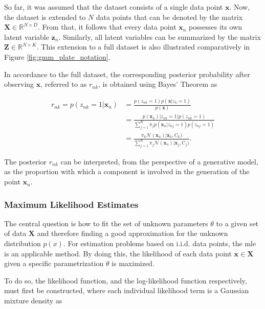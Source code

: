 So far, it was assumed that the dataset consists of a single data point $\bm{x}$. Now, the dataset is extended to $N$ data points that can be denoted by the matrix $\bm{X} \in \mathbb{R}^{N \times D}$. From that, it follows that every data point $\bm{x}_n$ possesses its own latent variable $\bm{z}_n$. Similarly, all latent variables can be summarized by the matrix $\bm{Z} \in \mathbb{R}^{N \times K}$. This extension to a full dataset is also illustrated comparatively in Figure \ref{fig:gmm_plate_notation}.

In accordance to the full dataset, the corresponding posterior probability after observing $\bm{x}$, referred to as $r_{nk}$, is obtained using Bayes' Theorem as

\begin{equation}\label{eq:responsibilities}
    \begin{aligned}
        r_{nk}=p(z_{nk}=1|\bm{x}_n) &= \frac{p(z_{nk}=1)p(\bm{x} | z_k=1)}{p(\bm{x})}\\[5pt]
        &= \frac{p(\bm{x}_n) | z_{nk}=1)p(z_{nk}=1)}{\sum_{j=1}^K\pi_j p(\bm{x}_n | z_{nj}=1)p(z_{nj}=1)} \\[5pt]
        &= \frac{\pi_k\mathcal{N}(\bm{x}_n) | \overline{\bm{x}}_k, \bm{\mathrm{C}}_k)}{\sum_{j=1}^K\pi_j\mathcal{N}(\bm{x}_n) | \overline{\bm{x}}_j, \bm{\mathrm{C}}_j)}.
    \end{aligned}
\end{equation}

The posterior $r_{nk}$ can be interpreted, from the perspective of a generative model, as the proportion with which a component is involved in the generation of the point $\bm{x}_n$.

\subsubsection{Maximum Likelihood Estimates}

The central question is how to fit the set of unknown parameters $\theta$ to a given set of data $\bm{X}$ and therefore finding a good approximation for the unknown distribution $p(x)$. For estimation problems based on i.i.d. data points, the \acrfull{mle} is an applicable method. \cite[p. 317]{dei_2020} By doing this, the likelihood of each data point $\bm{x} \in \bm{X}$ given a specific parametrization $\theta$ is maximized. 

\newpage

To do so, the likelihood function, and the log-likelihood function respectively, must first be constructed, where each individual likelihood term is a Gaussian mixture density as

